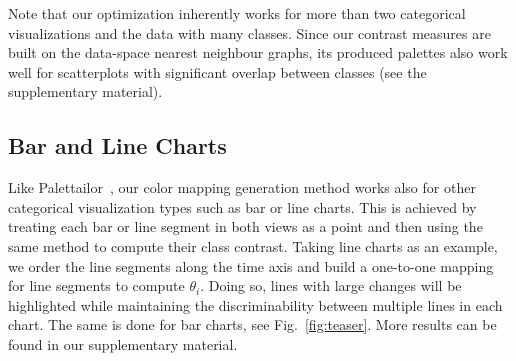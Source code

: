 Note that our optimization inherently works for more than two categorical visualizations and the data with many classes. Since our contrast measures are built on the data-space nearest neighbour graphs, its produced palettes also work well for scatterplots with significant overlap between classes (see the supplementary material).





\subsection{Bar and Line Charts}
\label{subsec:ext}
Like Palettailor~\cite{Lu21}, our color mapping generation method works also for other categorical visualization types such as bar or line charts. This is achieved by treating each bar or line segment in both views as a point and then using the same method to compute their class contrast.
Taking line charts as an example,  we order the line segments along the time axis and build a one-to-one mapping for line segments to compute $\theta_i$.
Doing so, lines with large changes will be highlighted while maintaining the discriminability between multiple lines in each chart. The same is done for bar charts, see Fig.~\ref{fig:teaser}.
More results can be found in our supplementary material.

